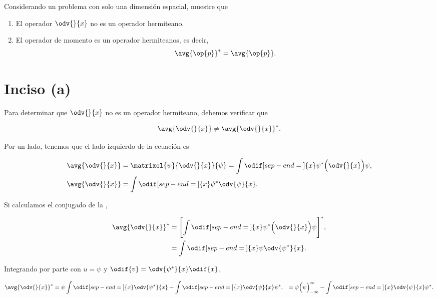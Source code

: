 \documentclass[../main.tex]{subfiles}
\begin{document}
\begin{problema}[10]
	Considerando un problema con solo una dimensión espacial, muestre que

	\begin{enumerate}
		\item El operador \(\odv{}{x}\) no es un operador hermiteano.
		\item El operador de momento es un operador hermiteanos, es decir,
		      \begin{equation*}
			      \avg{\op{p}}^{*} = \avg{\op{p}}.
		      \end{equation*}
	\end{enumerate}

	\startsolution

	\section{Inciso (a)}

	Para determinar  que \(\odv{}{x}\) no es un operador hermiteano, debemos verificar que

	\begin{equation}
		\avg{\odv{}{x}} \neq \avg{\odv{}{x}}^{*}.
	\end{equation}

	Por un lado, tenemos que el lado izquierdo de la ecuación es

	\begin{align}
		\avg{\odv{}{x}} & = \matrixel{\psi}{\odv{}{x}}{\psi} = \int \odif[sep-end=\medspace]{x} \psi^{*}\Bigl(\odv{}{x}\Bigr)\psi,\nonumber \\
		\avg{\odv{}{x}} & = \int \odif[sep-end=\medspace]{x} \psi^{*}\odv{\psi}{x}.\label{eq:avg-psi}
	\end{align}

	Si calculamos el conjugado de la ,

	\begin{align*}
		\avg{\odv{}{x}}^{*} & = \Biggl[\int \odif[sep-end=\medspace]{x} \psi^{*}\Bigl(\odv{}{x}\Bigr)\psi\Biggr]^{*},\nonumber \\
		                    & = \int \odif[sep-end=\medspace]{x} \psi \odv{\psi^{*}}{x}.
	\end{align*}

	Integrando por parte con \(u = \psi\) y \( \odif{v} = \odv{\psi^{*}}{x} \odif{x}\),

	\begin{align*}
		\avg{\odv{}{x}}^{*} & = \psi \int \odif[sep-end=\medspace]{x} \odv{\psi^{*}}{x} - \int \odif[sep-end=\medspace]{x} \odv{\psi}{x} \psi^{*},
		                    & = \psi \Bigl(\psi\Bigr)_{-\infty}^{\infty} - \int \odif[sep-end=\medspace]{x} \odv{\psi}{x} \psi^{*}.
	\end{align*}


\end{problema}
\end{document}
